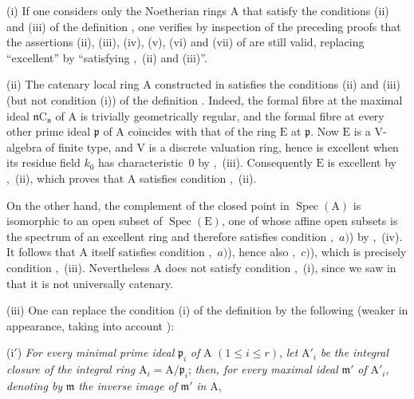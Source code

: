 \begin{remarks}[7.8.4]
\label{IV.7.8.4}
(i) If one considers only the Noetherian rings $\mathrm{A}$ that satisfy the conditions (ii) and (iii) of the definition , one verifies by inspection of the preceding proofs that the assertions (ii), (iii), (iv), (v), (vi) and (vii) of  are still valid, replacing ``excellent'' by ``satisfying ,~(ii) and (iii)''.

(ii) The catenary local ring $\mathrm{A}$ constructed in  satisfies the conditions (ii) and (iii) (but not condition (i)) of the definition . Indeed, the formal fibre at the maximal ideal $\mathfrak{n}\mathrm{C}_\mathfrak{n}$ of $\mathrm{A}$ is trivially geometrically regular, and the formal fibre at every other prime ideal $\mathfrak{p}$ of $\mathrm{A}$ coincides with that of the ring $\mathrm{E}$ at $\mathfrak{p}$. Now $\mathrm{E}$ is a $\mathrm{V}$-algebra of finite type, and $\mathrm{V}$ is a discrete valuation ring, hence is excellent when its residue field $k_0$ has characteristic~$0$ by ,~(iii). Consequently $\mathrm{E}$ is excellent by ,~(ii), which proves that $\mathrm{A}$ satisfies condition ,~(ii).


On the other hand, the complement of the closed point in $\operatorname{Spec}(\mathrm{A})$ is isomorphic to an open subset of $\operatorname{Spec}(\mathrm{E})$, one of whose affine open subsets is the spectrum of an excellent ring and therefore satisfies condition ,~$a)$) by ,~(iv). It follows that $\mathrm{A}$ itself satisfies condition ,~$a)$), hence also ,~$c)$), which is precisely condition ,~(iii). Nevertheless $\mathrm{A}$ does not satisfy condition ,~(i), since we saw in  that it is not universally catenary.

(iii) One can replace the condition (i) of the definition  by the following (weaker in appearance, taking into account ):

(i$'$) \emph{For every minimal prime ideal} $\mathfrak{p}_i$ \emph{of} $\mathrm{A}$ $(1\leqslant i\leqslant r)$, \emph{let} $\mathrm{A}'_i$ \emph{be the integral closure of the integral ring} $\mathrm{A}_i=\mathrm{A}/\mathfrak{p}_i$; \emph{then, for every maximal ideal} $\mathfrak{m}'$ \emph{of} $\mathrm{A}'_i$, \emph{denoting by} $\mathfrak{m}$ \emph{the inverse image of} $\mathfrak{m}'$ \emph{in} $\mathrm{A}$,


\end{remarks}
